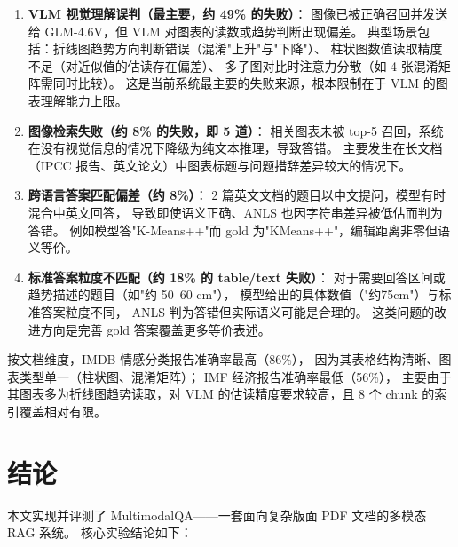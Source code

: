 ﻿\documentclass[UTF8, heading=true]{ctexart}
\begin{document}
\begin{enumerate}
    \item \textbf{VLM 视觉理解误判（最主要，约 49\% 的失败）}：
    图像已被正确召回并发送给 GLM-4.6V，但 VLM 对图表的读数或趋势判断出现偏差。
    典型场景包括：折线图趋势方向判断错误（混淆"上升"与"下降"）、
    柱状图数值读取精度不足（对近似值的估读存在偏差）、
    多子图对比时注意力分散（如 4 张混淆矩阵需同时比较）。
    这是当前系统最主要的失败来源，根本限制在于 VLM 的图表理解能力上限。

    \item \textbf{图像检索失败（约 8\% 的失败，即 5 道）}：
    相关图表未被 top-5 召回，系统在没有视觉信息的情况下降级为纯文本推理，导致答错。
    主要发生在长文档（IPCC 报告、英文论文）中图表标题与问题措辞差异较大的情况下。

    \item \textbf{跨语言答案匹配偏差（约 8\%）}：
    2 篇英文文档的题目以中文提问，模型有时混合中英文回答，
    导致即使语义正确、ANLS 也因字符串差异被低估而判为答错。
    例如模型答"K-Means++"而 gold 为"KMeans++"，编辑距离非零但语义等价。

    \item \textbf{标准答案粒度不匹配（约 18\% 的 table/text 失败）}：
    对于需要回答区间或趋势描述的题目（如"约 50~60 cm"），
    模型给出的具体数值（"约75cm"）与标准答案粒度不同，
    ANLS 判为答错但实际语义可能是合理的。
    这类问题的改进方向是完善 gold 答案覆盖更多等价表述。
\end{enumerate}

按文档维度，IMDB 情感分类报告准确率最高（86\%），
因为其表格结构清晰、图表类型单一（柱状图、混淆矩阵）；
IMF 经济报告准确率最低（56\%），
主要由于其图表多为折线图趋势读取，对 VLM 的估读精度要求较高，且 8 个 chunk 的索引覆盖相对有限。

\section{结论}

本文实现并评测了 MultimodalQA——一套面向复杂版面 PDF 文档的多模态 RAG 系统。
核心实验结论如下：
\end{document}
